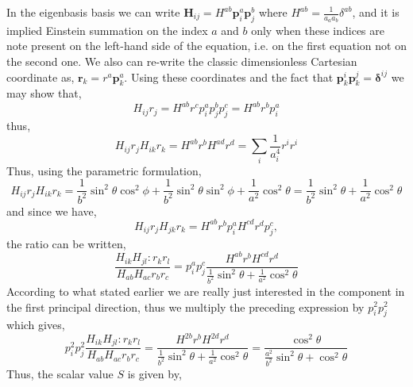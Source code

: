 In the eigenbasis basis we can write $\textbf{H}_{ij} =H^{ab}\textbf{p}_i^a \textbf{p}^b_j$ where $H^{ab} = \frac{1}{a_a a_b} \delta^{ab}$, and it is implied Einstein summation on the index $a$ and $b$ only when these indices are note present on the left-hand side of the equation, i.e. on the first equation not on the second one. 
We also can re-write the classic dimensionless Cartesian coordinate as, $\textbf{r}_k = r^a \textbf{p}^a_k$. 
Using these coordinates and the fact that $\textbf{p}^i_k\textbf{p}^j_k = \bm\delta^{ij}$ we may show that, 
\begin{equation*}
    H_{ij}r_j
    = H^{ab} r^c p_i^a p_j^b p_j^c
    = H^{ab} r^b p_i^a
\end{equation*}
thus, 
\begin{equation*}
    H_{ij} r_j  H_{ik} r_k
    = 
    H^{ab} r^b  H^{ad} r^d 
    =
    \sum_i \frac{1}{a_i^4} r^i r^i
\end{equation*}
Thus, using the parametric formulation, 
\begin{equation*}
    H_{ij} r_j  H_{ik} r_k
    =
    \frac{1}{b^2}  \sin^2\theta \cos^2\phi
    +   \frac{1}{b^2} \sin^2\theta \sin^2\phi
    +   \frac{1}{a^2} \cos^2\theta 
    = \frac{1}{b^2}  \sin^2\theta 
    +   \frac{1}{a^2} \cos^2\theta 
\end{equation*}
and since we have, 
\begin{equation*}
    H_{ij} r_j  H_{jk} r_k
    = 
    H^{ab} r^b p_i^a
    H^{cd} r^d p_j^c,
\end{equation*}
the ratio can be written,
\begin{equation*}
    \frac{ H_{ik} H_{jl} :  r_kr_l}{  H_{ab}  H_{ac} r_br_c} 
    = p_i^a p_j^c \frac{H^{ab} r^b H^{cd} r^d}
    { \frac{1}{b^2}  \sin^2\theta 
    +   \frac{1}{a^2} \cos^2\theta }
\end{equation*}
According to what stated earlier we are really just interested in the component in the first principal direction, thus we multiply the preceding expression by $p_i^2p_j^2$ which gives, 
\begin{equation*}
    p_i^2p_j^2 \frac{ H_{ik} H_{jl} :  r_kr_l}{  H_{ab}  H_{ac} r_br_c} 
    =  \frac{H^{2b} r^b H^{2d} r^d}
    { \frac{1}{b^2}  \sin^2\theta 
    +   \frac{1}{a^2} \cos^2\theta }
    =  \frac{ \cos^2\theta}
    { \frac{a^2}{b^2}  \sin^2\theta 
    +    \cos^2\theta }
\end{equation*}
Thus, the scalar value $S$ is given by, 
